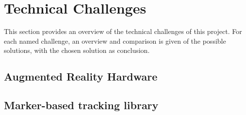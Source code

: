 \chapter{Technical Challenges} \label{ch:technicalchallenges}
	This section provides an overview of the technical challenges of 
	this project. For each named challenge, an overview and comparison is 
	given of the possible solutions, with the chosen solution as conclusion.
	
	\section{Augmented Reality Hardware} \label{sec:arhardware}
	
	
	\section{Marker-based tracking library} \label{sec:trackinglib}
	

